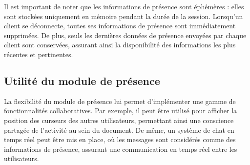 Il est important de noter que les informations de présence sont éphémères : elles sont stockées uniquement en mémoire pendant la durée de la session. Lorsqu'un client se déconnecte, toutes ses informations de présence sont immédiatement supprimées. De plus, seuls les dernières données de présence envoyées par chaque client sont conservées, assurant ainsi la disponibilité des informations les plus récentes et pertinentes.

\subsection{Utilité du module de présence}
La flexibilité du module de présence lui permet d'implémenter une gamme de fonctionnalités collaboratives. Par exemple, il peut être utilisé pour afficher la position des curseurs des autres utilisateurs, permettant ainsi une conscience partagée de l'activité au sein du document. De même, un système de chat en temps réel peut être mis en place, où les messages sont considérés comme des informations de présence, assurant une communication en temps réel entre les utilisateurs.